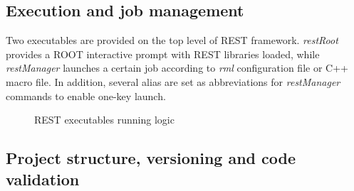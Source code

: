 

\subsection{Execution and job management}

Two executables are provided on the top level of REST framework. \emph{restRoot} provides a ROOT interactive prompt with REST libraries loaded, while \emph{restManager} launches a certain job according to \emph{rml} configuration file or C++ macro file. In addition, several alias are set as abbreviations for \emph{restManager} commands to enable one-key launch.

\begin{figure}[htb!]
  \centering
	\caption{REST executables running logic}\label{fig:pipelines}
\end{figure}




\subsection{Project structure, versioning and code validation}


